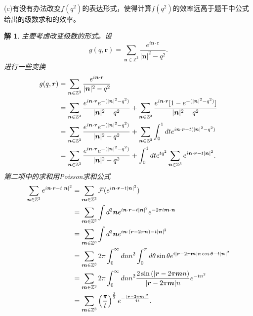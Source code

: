 \documentclass[10pt]{ctexart}
\newtheorem*{solution}{解}
\begin{document}
(c)有没有办法改变$f(q^2)$的表达形式，使得计算$f(q^2)$的效率远高于题干中公式给出的级数求和的效率。
\begin{solution}
    主要考虑改变级数的形式。设
    $$g(q,\bm{r})=\sum\limits_{\bm{n}\in\mathbb{Z}^3}\frac{e^{i\bm{n}\cdot\bm{r}}}{\lvert\bm{n}\rvert^2-q^2}.$$
    进行一些变换
    \begin{align}
        g(q,\bm{r})&=\sum\limits_{\bm{n}\in\mathbb{Z}^3}\frac{e^{i\bm{n}\cdot\bm{r}}}{\lvert\bm{n}\rvert^2-q^2}\notag\\
        &=\sum\limits_{\bm{n}\in\mathbb{Z}^3}\frac{e^{i\bm{n}\cdot\bm{r}}e^{-(\lvert\bm{n}\rvert^2-q^2)}}{\lvert\bm{n}\rvert^2-q^2}
        +\sum\limits_{\bm{n}\in\mathbb{Z}^3}\frac{e^{i\bm{n}\cdot\bm{r}}[1-e^{-(\lvert\bm{n}\rvert^2-q^2)}]}{\lvert\bm{n}\rvert^2-q^2}\notag\\
        &=\sum\limits_{\bm{n}\in\mathbb{Z}^3}\frac{e^{i\bm{n}\cdot\bm{r}}e^{-(\lvert\bm{n}\rvert^2-q^2)}}{\lvert\bm{n}\rvert^2-q^2}
        +\sum\limits_{\bm{n}\in\mathbb{Z}^3}\int_{0}^{1}dte^{i\bm{n}\cdot\bm{r}-t(\lvert\bm{n}\rvert^2-q^2)}\notag\\
        &=\sum\limits_{\bm{n}\in\mathbb{Z}^3}\frac{e^{i\bm{n}\cdot\bm{r}}e^{-(\lvert\bm{n}\rvert^2-q^2)}}{\lvert\bm{n}\rvert^2-q^2}
        +\int_{0}^{1}dt e^{tq^2}\sum\limits_{\bm{n}\in\mathbb{Z}^3}e^{i\bm{n}\cdot\bm{r}-t\lvert\bm{n}\rvert^2}.\notag
    \end{align}
    第二项中的求和用Poisson求和公式
    \begin{align}
        \sum\limits_{\bm{n}\in\mathbb{Z}^3}e^{i\bm{n}\cdot\bm{r}-t\lvert\bm{n}\rvert^2}&=\sum\limits_{\bm{m}\in\mathbb{Z}^3}\mathcal{F}(e^{i\bm{n}\cdot\bm{r}-t\lvert\bm{n}\rvert^2})\notag\\
        &=\sum\limits_{\bm{m}\in\mathbb{Z}^3}\int d^3\bm{n}e^{i\bm{n}\cdot\bm{r}-t\lvert\bm{n}\rvert^2}e^{-2\pi i\bm{m}\cdot\bm{n}}\notag\\
        &=\sum\limits_{\bm{m}\in\mathbb{Z}^3}\int d^3\bm{n}e^{i\bm{n}\cdot(\bm{r}-2\pi\bm{n})-t\lvert\bm{n}\rvert^2}\notag\\
        &=\sum\limits_{\bm{m}\in\mathbb{Z}^3}2\pi\int_{0}^{\infty}dn n^2\int_{0}^{\pi}d\theta\sin{\theta}e^{i\lvert\bm{r}-2\pi\bm{m}\rvert n\cos{\theta}-t\lvert\bm{n}\rvert^2}\notag\\
        &=\sum\limits_{\bm{m}\in\mathbb{Z}^3}2\pi\int_{0}^{\infty}dn n^2\frac{2\sin{(\lvert\bm{r}-2\pi\bm{m}n)}}{\lvert\bm{r}-2\pi\bm{m}\rvert n}e^{-tn^2}\notag\\
        &=\sum\limits_{\bm{m}\in\mathbb{Z}^3}\left(\frac{\pi}{t}\right)^{\frac{3}{2}}e^{-\frac{\lvert\bm{r}-2\pi\bm{m}\rvert^2}{4t}}.\notag

\end{align}
\end{solution}
\end{document}
